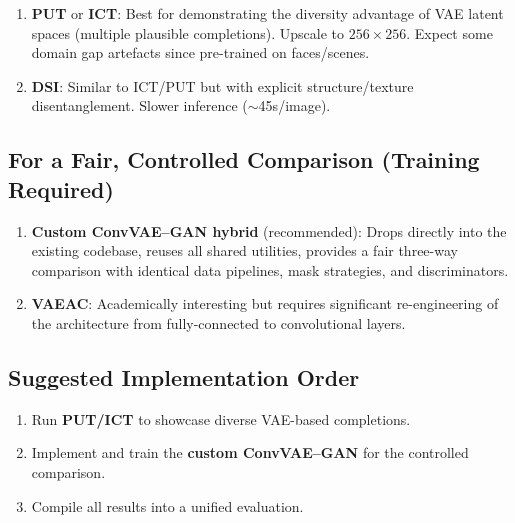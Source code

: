 \documentclass[11pt, a4paper]{article}
\begin{document}
\begin{enumerate}[leftmargin=2em]
    \item \textbf{PUT} or \textbf{ICT}: Best for demonstrating the diversity advantage of VAE latent spaces (multiple plausible completions). Upscale to \(256 \times 256\). Expect some domain gap artefacts since pre-trained on faces/scenes.
  \item \textbf{DSI}: Similar to ICT/PUT but with explicit structure/texture disentanglement. Slower inference ($\sim$45s/image).
\end{enumerate}

\subsection*{For a Fair, Controlled Comparison (Training Required)}

\begin{enumerate}[leftmargin=2em]
  \item \textbf{Custom ConvVAE--GAN hybrid} (recommended): Drops directly into the existing codebase, reuses all shared utilities, provides a fair three-way comparison with identical data pipelines, mask strategies, and discriminators.
  \item \textbf{VAEAC}: Academically interesting but requires significant re-engineering of the architecture from fully-connected to convolutional layers.
\end{enumerate}

\subsection*{Suggested Implementation Order}

\begin{enumerate}[leftmargin=2em]
    \item Run \textbf{PUT/ICT} to showcase diverse VAE-based completions.
  \item Implement and train the \textbf{custom ConvVAE--GAN} for the controlled comparison.
  \item Compile all results into a unified evaluation.
\end{enumerate}
\end{document}
